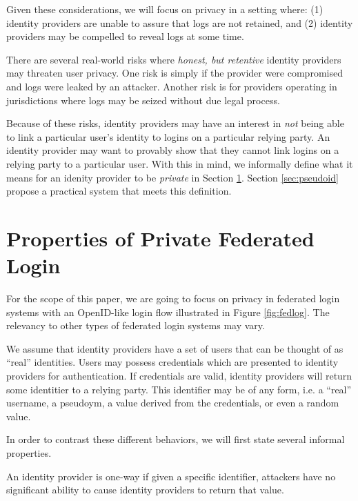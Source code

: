 \documentclass{llncs}
\begin{document}
Given these considerations, we will focus on privacy in a setting where:
(1) identity providers are unable to assure that logs are not retained, and
(2) identity providers may be compelled to reveal logs at some time.

There are several real-world risks where \emph{honest, but retentive}
identity providers may threaten user privacy. One risk is simply if
the provider were compromised and logs were leaked by an
attacker. Another risk is for providers operating in jurisdictions
where logs may be seized without due legal process. 

Because of these risks, identity providers may have an interest in \emph{not}
being able to link a particular user's identity to logins on a particular
relying party. An identity provider may want to provably show that
they cannot link logins on a relying party to a particular user. With
this in mind, we informally define what it means for an idenity
provider to be \emph{private} in Section
\ref{sec:private-fed-login}. Section \ref{sec:pseudoid} propose a
practical system that meets this definition.

\section{Properties of Private Federated Login}
\label{sec:private-fed-login}

For the scope of this paper, we are going to focus on privacy in
federated login systems with an OpenID-like login flow illustrated in
Figure \ref{fig:fedlog}. The relevancy to other types of federated
login systems may vary. 

We assume that identity providers have a set of users that can be
thought of as ``real'' identities. Users may possess credentials which
are presented to identity providers for authentication. If credentials
are valid, identity providers will return some identitier to a relying
party. This identifier may be of any form, i.e. a ``real'' username, a
pseudoym, a value derived from the credentials, or even a random value.

In order to contrast these different behaviors, we will first state
several informal properties.

\begin{definition}
\label{def:ownership}
An identity provider is one-way if given a specific identifier,
attackers have no significant ability to cause identity providers to
return that value.
\end{definition}
\end{document}
